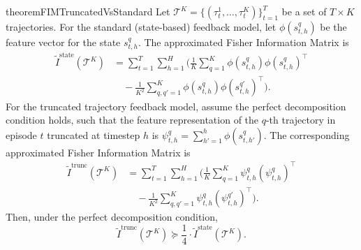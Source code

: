 \documentclass{article}
\begin{document}
\begin{restatable}{theorem}{FIMTruncatedVsStandard}
\label{thm:fim_comparison}
Let $\mathcal{T}^K = \{ (\tau^1_t, \dots, \tau^K_t) \}_{t=1}^T$ be a set of $T \times K$ trajectories.
For the standard (state-based) feedback model, let $\phi(s^q_{t,h})$ be the feature vector for the state $s^q_{t,h}$. The approximated Fisher Information Matrix is
\begin{align*}
\tilde{I}^{\text{state}}(\mathcal{T}^K)
&= \sum_{t=1}^T \sum_{h=1}^H \Bigg( \frac{1}{K} \sum_{q=1}^K \phi(s^q_{t,h})\phi(s^q_{t,h})^\top \\
&\quad - \frac{1}{K^2} \sum_{q,q'=1}^K \phi(s^q_{t,h})\phi(s^{q'}_{t,h})^\top \Bigg).
\end{align*}
For the truncated trajectory feedback model, assume the perfect decomposition condition holds, such that the feature representation of the $q$-th trajectory in episode $t$ truncated at timestep $h$ is $\psi^q_{t,h} = \sum_{h'=1}^h \phi(s^q_{t,h'})$. The corresponding approximated Fisher Information Matrix is
\begin{align*}
\tilde{I}^{\text{trunc}}(\mathcal{T}^K)
&= \sum_{t=1}^T \sum_{h=1}^H \Bigg( \frac{1}{K} \sum_{q=1}^K \psi^q_{t,h}(\psi^q_{t,h})^\top \\
&\quad - \frac{1}{K^2} \sum_{q,q'=1}^K \psi^q_{t,h}(\psi^{q'}_{t,h})^\top \Bigg).
\end{align*}
Then, under the perfect decomposition condition,
\[ \tilde{I}^{\text{trunc}}(\mathcal{T}^K) \succeq \frac{1}{4} \cdot \tilde{I}^{\text{state}}(\mathcal{T}^K). \]
\end{restatable}
\end{document}
